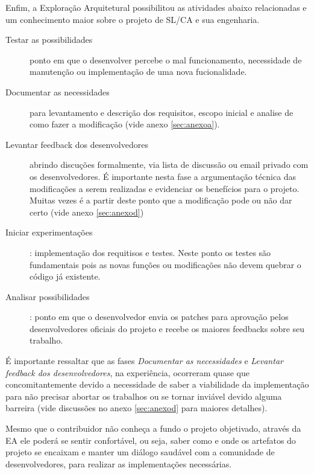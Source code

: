 
Enfim, a Exploração Arquitetural possibilitou as atividades abaixo relacionadas e um conhecimento maior sobre o projeto de SL/CA e sua engenharia. 
\begin{description}
\item [Testar as possibilidades] ponto em que o desenvolver percebe o mal funcionamento, necessidade de manutenção ou implementação de uma nova fucionalidade.
\item [Documentar as necessidades] para levantamento e descrição dos requisitos, escopo inicial e analise de como fazer a modificação (vide anexo \ref{sec:anexoa}).
\item [Levantar feedback dos desenvolvedores] abrindo discuções formalmente, via lista de discussão ou email privado com os desenvolvedores. É importante nesta fase a argumentação técnica das modificações a serem realizadas e evidenciar os benefícios para o projeto. Muitas vezes é a partir deste ponto que a modificação pode ou não dar certo (vide anexo \ref{sec:anexod})
\item [Iniciar experimentações]: implementação dos requitisos e testes. Neste ponto os testes são fundamentais pois as novas funções ou modificações não devem quebrar o código já existente.
\item [Analisar possibilidades]: ponto em que o desenvolvedor envia os patches para aprovação pelos desenvolvedores oficiais do projeto e recebe os maiores feedbacks sobre seu trabalho.   \end{description}

É importante ressaltar que as fases \textit{Documentar as necessidades} e \textit{Levantar feedback dos desenvolvedores}, na experiência, ocorreram quase que concomitantemente devido a necessidade de saber a viabilidade da implementação para não precisar abortar os trabalhos ou se tornar inviável devido alguma barreira (vide discussões no anexo \ref{sec:anexod} para maiores detalhes).

Mesmo que o contribuidor não conheça a fundo o projeto objetivado, através da EA ele poderá se sentir confortável, ou seja, saber como e onde os artefatos do projeto se encaixam e manter um diálogo saudável com a comunidade de desenvolvedores, para realizar as implementações necessárias.

